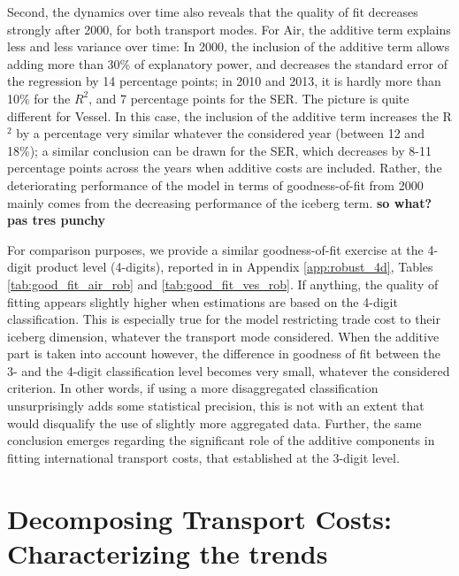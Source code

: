 \documentclass[a4paper,11pt]{article}
\begin{document}
Second, the dynamics over time also reveals that the quality of fit decreases strongly after 2000, for both transport modes. For Air, the additive term explains less and less variance over time: In 2000, the inclusion of the additive term allows adding more than 30\% of explanatory power, and decreases the standard error of the regression by 14 percentage points;  in 2010 and 2013, it is hardly more than 10\% for the $R^{2}$, and 7 percentage points for the SER. The picture is quite different for Vessel. In this case, the inclusion of the additive term increases the R$^{2}$ by a percentage very similar whatever the considered year (between 12 and 18\%); a similar conclusion can be drawn for the SER, which decreases by 8-11 percentage points across the years when additive costs are included. Rather, the deteriorating performance of the model in terms of goodness-of-fit from 2000 mainly comes from the decreasing performance of the iceberg term. \textbf{so what? pas tres punchy}\smallskip

For comparison purposes, we provide a similar goodness-of-fit exercise at the 4-digit product level (4-digits), reported in in Appendix \ref{app:robust_4d}, Tables \ref{tab:good_fit_air_rob} and \ref{tab:good_fit_ves_rob}. If anything, the quality of fitting appears slightly higher when estimations are based on the 4-digit classification. This is especially true for the model restricting trade cost to their iceberg dimension, whatever the transport mode considered. When the additive part is taken into account however, the difference in goodness of fit between the 3- and the 4-digit classification level becomes very small, whatever the considered criterion. In other words, if using a more disaggregated classification unsurprisingly adds some statistical precision, this is not with an extent that would disqualify the use of slightly more aggregated data. Further, the same conclusion emerges regarding the significant role of the additive components in fitting international transport costs, that established at the 3-digit level.


\section{Decomposing Transport Costs: Characterizing the trends \label{sec:results_trends}}
\end{document}
